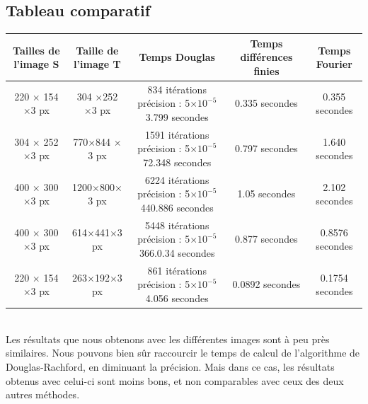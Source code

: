 \subsection{Tableau comparatif}
\begin{tabular}{|c|c|c|c|c|}
\hline
Tailles de l'image S & Taille de l'image T& Temps Douglas & Temps différences finies & Temps Fourier\\
\hline
220 $\times$ 154 $\times$3 px & 304 $\times $252 $\times $3 px &  \shortstack{ 834 itérations\\ précision : 5$\times 10^{-5}$\\3.799 secondes} & 0.335 secondes & 0.355 secondes \\

\hline
304 $\times$ 252 $\times$3 px & 770$\times$844 $\times $3 px & \shortstack{ 1591 itérations\\ précision : 5$\times 10^{-5}$\\72.348 secondes} & 0.797 secondes & 1.640 secondes \\
\hline
400 $\times$ 300 $\times$3 px & 1200$\times$800$\times $3 px & \shortstack{ 6224 itérations\\ précision : 5$\times 10^{-5}$\\440.886 secondes} & 1.05 secondes & 2.102 secondes \\
\hline
400 $\times$ 300 $\times$3 px & 614$\times$441$\times $3 px & \shortstack{ 5448 itérations\\ précision : 5$\times 10^{-5}$\\366.0.34 secondes} & 0.877 secondes & 0.8576 secondes \\
\hline
220 $\times$ 154 $\times$3 px & 263$\times$192$\times $3 px & \shortstack{ 861 itérations\\ précision : 5$\times 10^{-5}$\\4.056 secondes} & 0.0892 secondes & 0.1754 secondes \\
\hline

\end{tabular}\\
Les résultats que nous obtenons avec les différentes images sont à peu près similaires. Nous pouvons bien sûr raccourcir le temps de calcul de l'algorithme de Douglas-Rachford, en diminuant la précision. Mais dans ce cas, les résultats obtenus avec celui-ci sont moins bons, et non comparables avec ceux des deux autres méthodes. 
